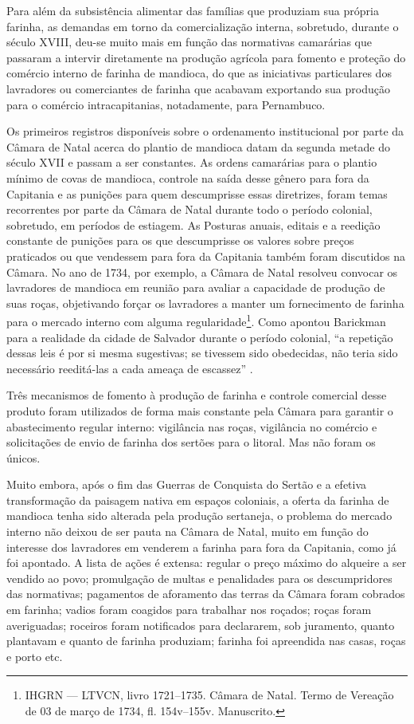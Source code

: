 \begin{refsection}
Para além da subsistência alimentar das famílias que produziam sua própria farinha, as demandas em torno da comercialização interna, sobretudo, durante o século XVIII, deu-se muito mais em função das normativas camarárias que passaram a intervir diretamente na produção agrícola para fomento e proteção do comércio interno de farinha de mandioca, do que as iniciativas particulares dos lavradores ou comerciantes de farinha que acabavam exportando sua produção para o comércio intracapitanias, notadamente, para Pernambuco. 

Os primeiros registros disponíveis sobre o ordenamento institucional por parte da Câmara de Natal acerca do plantio de mandioca datam da segunda metade do século XVII e passam a ser constantes. As ordens camarárias para o plantio mínimo de covas de mandioca, controle na saída desse gênero para fora da Capitania e as punições para quem descumprisse essas diretrizes, foram temas recorrentes por parte da Câmara de Natal durante todo o período colonial, sobretudo, em períodos de estiagem. As Posturas anuais, editais e a reedição constante de punições para os que descumprisse os valores sobre preços praticados ou que vendessem para fora da Capitania também foram discutidos na Câmara. No ano de 1734, por exemplo, a Câmara de Natal resolveu convocar os lavradores de mandioca em reunião para avaliar a capacidade de produção de suas roças, objetivando forçar os lavradores a manter um fornecimento de farinha para o mercado interno com alguma regularidade\footnote{IHGRN --- LTVCN, livro 1721--1735. Câmara de Natal. Termo de Vereação de 03 de março de 1734, fl. 154v--155v. Manuscrito.}. Como apontou Barickman para a realidade da cidade de Salvador durante o período colonial, “a repetição dessas leis é por si mesma sugestivas; se tivessem sido obedecidas, não teria sido necessário reeditá-las a cada ameaça de escassez” \cite[p.~105]{Barickman2003acucar}. 

Três mecanismos de fomento à produção de farinha e controle comercial desse produto foram utilizados de forma mais constante pela Câmara para garantir o abastecimento regular interno: vigilância nas roças, vigilância no comércio e solicitações de envio de farinha dos sertões para o litoral. Mas não foram os únicos.  

Muito embora, após o fim das Guerras de Conquista do Sertão e a efetiva transformação da paisagem nativa em espaços coloniais, a oferta da farinha de mandioca tenha sido alterada pela produção sertaneja, o problema do mercado interno não deixou de ser pauta na Câmara de Natal, muito em função do interesse dos lavradores em venderem a farinha para fora da Capitania, como já foi apontado. A lista de ações é extensa: regular o preço máximo do alqueire a ser vendido ao povo; promulgação de multas e penalidades para os descumpridores das normativas; pagamentos de aforamento das terras da Câmara foram cobrados em farinha; vadios foram coagidos para trabalhar nos roçados; roças foram averiguadas; roceiros foram notificados para declararem, sob juramento, quanto plantavam e quanto de farinha produziam; farinha foi apreendida nas casas, roças e porto etc.  


\end{refsection}

